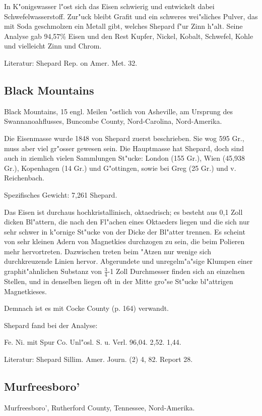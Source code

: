 \documentclass[a4paper, 11pt, oneside]{article}
\begin{document}
In K"onigswasser l"ost sich das Eisen schwierig und entwickelt dabei Schwefelwasserstoff. Zur"uck bleibt Grafit und ein schweres wei"sliches Pulver, das mit Soda geschmolzen ein Metall gibt, welches Shepard f"ur Zinn h"alt. Seine Analyse gab 94,57\% Eisen und den Rest Kupfer, Nickel, Kobalt, Schwefel, Kohle und vielleicht Zinn und Chrom.

Literatur: Shepard Rep. on Amer. Met. 32.

\subsection{Black Mountains}

Black Mountains, 15 engl. Meilen "ostlich von Asheville, am Ursprung des Swannanoahflusses, Buncombe County, Nord-Carolina, Nord-Amerika.

Die Eisenmasse wurde 1848 von Shepard zuerst beschrieben. Sie wog 595 Gr., muss aber viel gr"osser gewesen sein. Die Hauptmasse hat Shepard, doch sind auch in ziemlich vielen Sammlungen St"ucke: London (155 Gr.), Wien (45,938 Gr.), Kopenhagen (14 Gr.) und G"ottingen, sowie bei Greg (25 Gr.) und v. Reichenbach.

Spezifisches Gewicht: 7,261 Shepard.

Das Eisen ist durchaus hochkristallinisch, oktaedrisch; es besteht aus 0,1 Zoll dicken Bl"attern, die nach den Fl"achen eines Oktaeders liegen und die sich nur sehr schwer in k"ornige St"ucke von der Dicke der Bl"atter trennen. Es scheint von sehr kleinen Adern von Magnetkies durchzogen zu sein, die beim Polieren mehr hervortreten. Dazwischen treten beim "Atzen nur wenige sich durchkreuzende Linien hervor. Abgerundete und unregelm"a"sige Klumpen einer graphit"ahnlichen Substanz von $\frac{3}{4}$-1 Zoll Durchmesser finden sich an einzelnen Stellen, und in denselben liegen oft in der Mitte gro"se St"ucke bl"attrigen Magnetkieses.

Demnach ist es mit Cocke County (p. 164) verwandt.

Shepard fand bei der Analyse:

Fe. Ni. mit Spur Co. Unl"osl. S. u. Verl.
96,04. 2,52. 1,44.

Literatur: Shepard Sillim. Amer. Journ. (2) 4, 82. Report 28.

\subsection{Murfreesboro'}

Murfreesboro', Rutherford County, Tennessee, Nord-Amerika.
\end{document}
